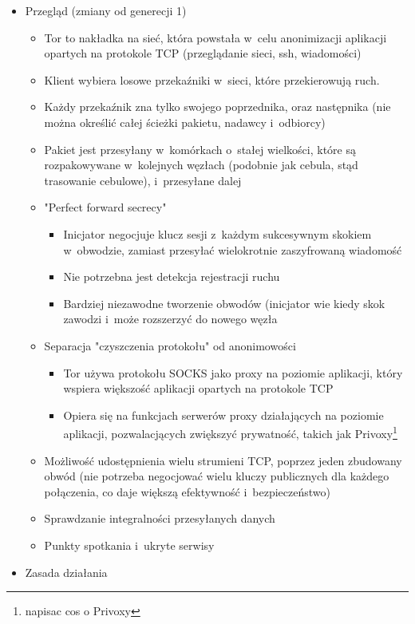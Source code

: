 \begin{itemize}
  \item Przegląd (zmiany od generecji 1)
  \begin{itemize}
   \item Tor to nakładka na sieć, która powstała w~celu anonimizacji aplikacji opartych na protokole TCP (przeglądanie sieci, ssh, wiadomości)
   \item Klient wybiera losowe przekaźniki w~sieci, które przekierowują ruch.
   \item Każdy przekaźnik zna tylko swojego poprzednika, oraz następnika (nie można określić całej ścieżki pakietu, nadawcy i~odbiorcy)
   \item Pakiet jest przesyłany w~komórkach o~stałej wielkości, które są rozpakowywane w~kolejnych węzłach (podobnie jak cebula, stąd trasowanie cebulowe), i~przesyłane dalej
   \item "Perfect forward secrecy"
   \begin{itemize}
    \item Inicjator negocjuje klucz sesji z~każdym sukcesywnym skokiem w~obwodzie, zamiast przesyłać wielokrotnie zaszyfrowaną wiadomość
    \item Nie potrzebna jest detekcja rejestracji ruchu
    \item Bardziej niezawodne tworzenie obwodów (inicjator wie kiedy skok zawodzi i~może rozszerzyć do nowego węzła
   \end{itemize}
   \item Separacja "czyszczenia protokołu" od anonimowości
   \begin{itemize}
    \item Tor używa protokołu SOCKS jako proxy na poziomie aplikacji, który wspiera większość aplikacji opartych na protokole TCP
    \item Opiera się na funkcjach serwerów proxy działających na poziomie aplikacji, pozwalacjących zwiększyć prywatność, takich jak Privoxy\footnote{napisac cos o Privoxy}
   \end{itemize}
   \item Możliwość udostępnienia wielu strumieni TCP, poprzez jeden zbudowany obwód (nie potrzeba negocjować wielu kluczy publicznych dla każdego połączenia, co daje większą efektywność i~bezpieczeństwo)
   \item Sprawdzanie integralności przesyłanych danych
   \item Punkty spotkania i~ukryte serwisy
  \end{itemize}
  \item Zasada działania
  \begin{itemize}

\end{itemize}
\end{itemize}
